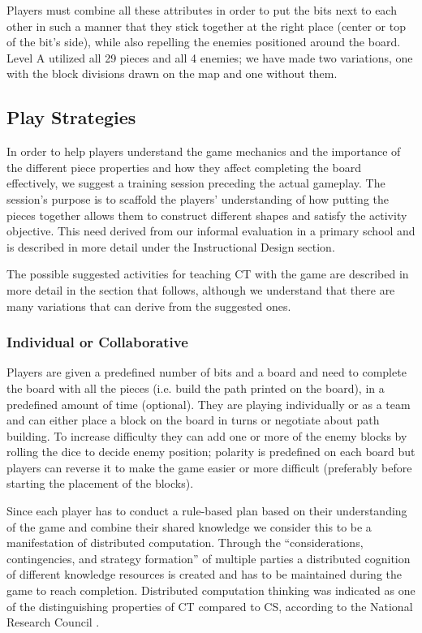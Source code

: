 \documentclass{acm_proc_article-sp}
\begin{document}
Players must combine all these attributes in order to put the bits next to each other in such a manner that they stick together at the right place (center or top of the bit's side), while also repelling the enemies positioned around the board.
Level A utilized all 29 pieces and all 4 enemies; we have made two variations, one with the block divisions drawn on the map and one without them.

\subsection{Play Strategies}
\label{sec:strategies}
In order to help players understand the game mechanics and the importance of the different piece properties and how they affect completing the board effectively, we suggest a training session preceding the actual gameplay.
The session's purpose is to scaffold the players' understanding of how putting the pieces together allows them to construct different shapes and satisfy the activity objective. This need derived from our informal evaluation in a primary school and is described in more detail under the Instructional Design section.

The possible suggested activities for teaching CT with the game are described in more detail in the section that follows, although we understand that there are many variations that can derive from the suggested ones.

\subsubsection{Individual or Collaborative}
\label{sec:collaboration}
Players are given a predefined number of bits and a board and need to complete the board with all the pieces (i.e. build the path printed on the board), in a predefined amount of time (optional).
They are playing individually or as a team and can either place a block on the board in turns or negotiate about path building.
To increase difficulty they can add one or more of the enemy blocks by rolling the dice to decide enemy position; polarity is predefined on each board but players can reverse it to make the game easier or more difficult (preferably before starting the placement of the blocks).

Since each player has to conduct a rule-based plan based on their understanding of the game and combine their shared knowledge we consider this to be a manifestation of distributed computation.
Through the ``considerations, contingencies, and strategy formation'' of multiple parties a distributed cognition of different knowledge resources is created \cite{weller2008escape} and has to be maintained during the game to reach completion.
Distributed computation thinking was indicated as one of the distinguishing properties of CT compared to CS, according to the National Research Council \cite{national2010report}.
\end{document}
